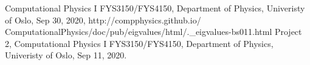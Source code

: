 \documentclass[reprint,english,notitlepage,nofootinbib]{revtex4-1}  %
\begin{document}
\onecolumngrid
\begin{thebibliography}{}
 Computational Physics I FYS3150/FYS4150, Department of Physics, Univeristy of Oslo, Sep 30, 2020, http://compphysics.github.io/
ComputationalPhysics/doc/pub/eigvalues/html/.\_eigvalues-bs011.html
 Project 2, Computational Physics I FYS3150/FYS4150, Department of Physics, Univeristy of Oslo, Sep 11, 2020.

\end{thebibliography}
\end{document}
